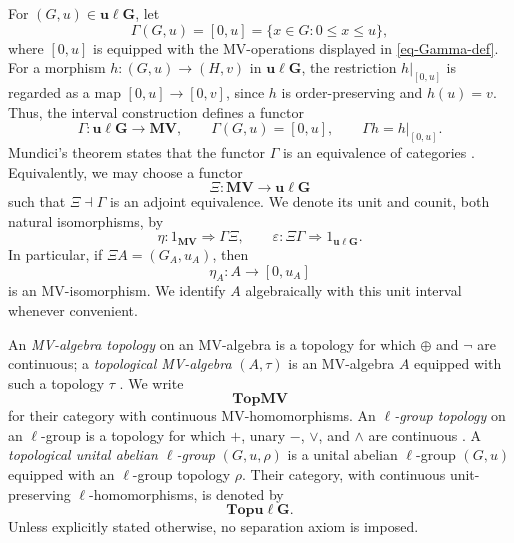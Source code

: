 \documentclass[preprint,3p]{elsarticle}
\theoremstyle{plain}
\theoremstyle{definition}
\newcommand{\TopMV}{\mathbf{TopMV}}
\newcommand{\Topulg}{\mathbf{Topu\ell G}}
\newcommand{\uLG}{\mathbf{u\ell G}}
\newcommand{\MV}{\mathbf{MV}}
\numberwithin{equation}{section}
\begin{document}
For $(G,u)\in\uLG$, let
\[
 \Gamma(G,u)=[0,u]=\{x\in G:0\leq x\leq u\},
\]
where $[0,u]$ is equipped with the MV-operations displayed in \eqref{eq-Gamma-def}.
For a morphism $h\colon(G,u)\longrightarrow(H,v)$ in $\uLG$, the restriction
$h|_{[0,u]}$ is regarded as a map $[0,u]\longrightarrow[0,v]$, 
since $h$ is order-preserving and $h(u)=v$. 
Thus, the interval construction defines a functor
\begin{equation}
\label{eq-Gamma-definition}
 \Gamma\colon\uLG\longrightarrow\MV,
 \qquad
 \Gamma(G,u)=[0,u],
 \qquad
 \Gamma h=h|_{[0,u]}.
\end{equation}
Mundici's theorem states that the functor $\Gamma$ is an equivalence
of categories \cite{Mundici1986,Cignoli1998}.
Equivalently, we may choose a functor
\[
 \Xi\colon\MV\longrightarrow\uLG
\]
such that $\Xi\dashv\Gamma$ is an adjoint equivalence.  We denote its unit
and counit, both natural isomorphisms, by
\begin{equation}
\label{eq-Mundici-unit-counit}
 \eta\colon1_{\MV}\Longrightarrow\Gamma\Xi,
 \qquad
 \varepsilon\colon\Xi\Gamma\Longrightarrow1_{\uLG}.
\end{equation}
In particular, if $\Xi A=(G_A,u_A)$, then
\begin{equation}
\label{eq-Mundici-unit}
 \eta_A\colon A\longrightarrow[0,u_A]
\end{equation}
is an MV-isomorphism.  We identify $A$ algebraically with this unit
interval whenever convenient.

An \emph{MV-algebra topology} on an MV-algebra is a topology for which
$\oplus$ and $\neg$ are continuous; a \emph{topological MV-algebra} $(A,\tau)$ is an
MV-algebra $A$ equipped with such a topology $\tau$ \cite{Hoo1997}.  We write 
\[
\TopMV
\] 
for their
category with continuous MV-homomorphisms.  An \emph{$\ell$-group topology}
on an $\ell$-group is a topology for which $+$, unary $-$, $\vee$, and
$\wedge$ are continuous \cite{Smarda1967,Ball1979}.  A \emph{topological unital 
abelian $\ell$-group} $(G,u,\rho)$ is a unital abelian $\ell$-group $(G,u)$ equipped 
with an $\ell$-group topology $\rho$.
Their category, with continuous unit-preserving $\ell$-homomorphisms, is
denoted by 
\[
\Topulg.
\]
Unless explicitly stated otherwise, no separation
axiom is imposed.
\end{document}
